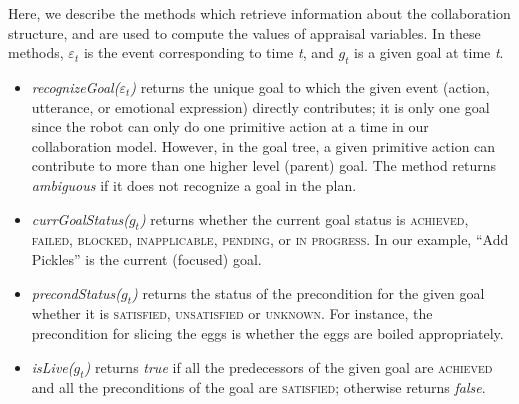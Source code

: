 \documentclass{article}
\begin{document}

Here, we describe the methods which retrieve information about the collaboration
structure, and are used to compute the values of appraisal variables. In these
methods, $\varepsilon_t$ is the event corresponding to time \textit{t}, and
$g_t$ is a given goal at time \textit{t}.

\begin{itemize}[leftmargin=2pt]
  \setlength\itemsep{0.2mm}
  \item \textit{recognizeGoal($\varepsilon_t$)} returns the unique goal to which
  the given event (action, utterance, or emotional expression) directly
  contributes; it is only one goal since the robot can only do one primitive
  action at a time in our collaboration model. However, in the goal tree, a
  given primitive action can contribute to more than one higher level (parent)
  goal. The method returns \textit{ambiguous} if it does not recognize a goal in
  the plan.
  
  
  \item \textit{currGoalStatus($g_t$)} returns whether the current goal status 
  is \textsc{achieved, failed, blocked, inapplicable, pending,} or \textsc{in
  progress}. In our example, ``Add Pickles'' is the current
  (focused) goal.
  
  \item \textit{precondStatus($g_t$)} returns the status of the precondition for
  the given goal whether it is \textsc{satisfied, unsatisfied} or
  \textsc{unknown}. For instance, the precondition for slicing the eggs is
  whether the eggs are boiled appropriately.
  
  \item \textit{isLive($g_t$)} returns \textit{true} if all the predecessors of
  the given goal are \textsc{achieved} and all the preconditions of the goal are
  \textsc{satisfied}; otherwise returns \textit{false}.
  

\end{itemize}
\end{document}
